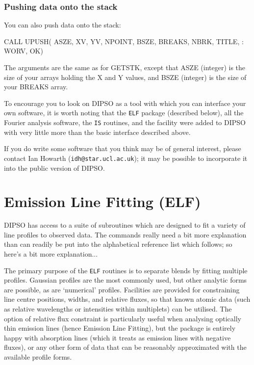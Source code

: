 \documentclass[twoside,11pt,noabs,nolof]{starlink}
\begin{document}
\subsubsection {Pushing data onto the stack}

You can also push data onto the stack:

\begin{terminalv}
      CALL UPUSH( ASZE, XV, YV, NPOINT, BSZE, BREAKS, NBRK, TITLE,
     :            WORV, OK)
\end{terminalv}

The arguments are the same as for GETSTK, except that ASZE (integer)
is the size of your arrays holding the X and Y values, and BSZE
(integer) is the size of your BREAKS array.

To encourage you to look on DIPSO as a tool with which you can interface
your own software, it is worth noting that the {\texttt{ELF}}  package
(described below), all the Fourier analysis software, the {\texttt{IS}}
routines, and the   facility were added to DIPSO with very
little more than the basic interface described above.

If you do write some software that you think may be of general interest, please
contact Ian Howarth ({\texttt{idh@star.ucl.ac.uk}});  it may be
possible to incorporate it into the public version of DIPSO.

\section {Emission Line Fitting (ELF)}

DIPSO has access to a suite of subroutines which are designed to fit a
variety of line profiles to observed data. The commands really need a
bit more explanation than can readily be put into the alphabetical
reference list which follows; so here's a bit more explanation...

The primary purpose of the {\texttt{ELF}}  routines is to separate blends by
fitting multiple profiles. Gaussian profiles are the most commonly
used, but other analytic forms are possible, as are `numerical'
profiles. Facilities are provided for constraining line centre
positions, widths, and relative fluxes, so that known atomic data
(such as relative wavelengths or intensities within multiplets) can be
utilised. The option of relative flux constraint is particularly
useful when analysing optically thin emission lines (hence Emission
Line Fitting), but the package is entirely happy with absorption lines
(which it treats as emission lines with negative fluxes), or any other
form of data that can be reasonably approximated with the available
profile forms.
\end{document}

